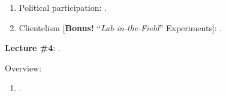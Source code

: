 \documentclass[letterpaper]{article}\usepackage[]{graphicx}\usepackage[svgnames]{xcolor}
\renewenvironment{itemize}{
  \begin{list}{}{
    \setlength{\leftmargin}{1.5em}
  }
}{
  \end{list}
}
\begin{document}
\begin{enumerate}
\begin{itemize}
\begin{enumerate}
          \item[$\bullet$] Political participation: \href{https://onlinelibrary.wiley.com/doi/pdf/10.1111/j.1540-5907.2008.00332.x}{}.


          \item[$\bullet$] Clientelism [{\bf Bonus!} ``\emph{Lab-in-the-Field}'' Experiments]: \href{https://doi.org/10.1177/0010414017695336}{}.


         \end{enumerate}

      \end{itemize}


  \item {\bf Lecture \#4}:  {\color{ForestGreen}{\bf Natural Experiments}}.


      \begin{itemize} 

        \item[$\diamond$] Overview:

        \begin{enumerate}



          \item[$\bullet$] \href{https://doi.org/10.1017/CBO9781139084444}{}. %



\end{enumerate}
\end{itemize}
\end{enumerate}
\end{document}

